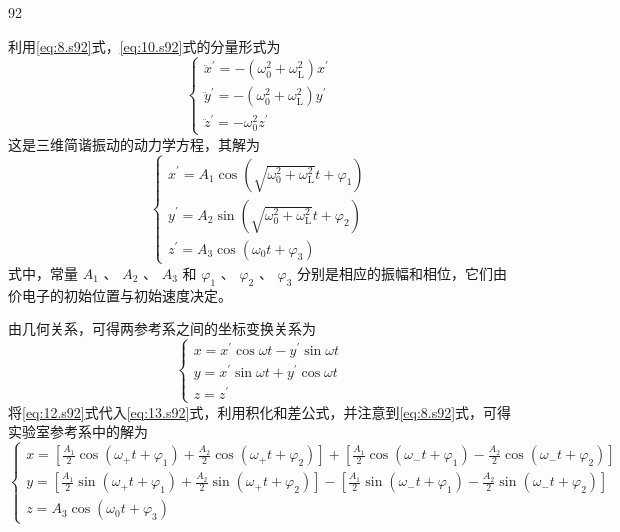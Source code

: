 \begin{solution}{92}
\begin{subsolution}
\begin{equation}
\label{eq:10.s92}
\end{equation}
利用\eqref{eq:8.s92}式，\eqref{eq:10.s92}式的分量形式为
\begin{equation}
\left\{ \begin{array}{l} \ddot {x} ^ {\prime} = - \left(\omega_ {0} ^ {2} + \omega_ {\mathrm{L}} ^ {2}\right) x ^ {\prime} \\ \ddot {y} ^ {\prime} = - \left(\omega_ {0} ^ {2} + \omega_ {\mathrm{L}} ^ {2}\right) y ^ {\prime} \\ \ddot {z} ^ {\prime} = - \omega_ {0} ^ {2} z ^ {\prime} \end{array} \right.
\label{eq:11.s92}
\end{equation}
这是三维简谐振动的动力学方程，其解为
\begin{equation}
\left\{ \begin{array}{l} x ^ {\prime} = A _ {1} \cos \left(\sqrt {\omega_ {0} ^ {2} + \omega_ {\mathrm{L}} ^ {2}} t + \varphi_ {1}\right) \\ y ^ {\prime} = A _ {2} \sin \left(\sqrt {\omega_ {0} ^ {2} + \omega_ {\mathrm{L}} ^ {2}} t + \varphi_ {2}\right) \\ z ^ {\prime} = A _ {3} \cos \left(\omega_ {0} t + \varphi_ {3}\right) \end{array} \right.
\label{eq:12.s92}
\end{equation}
式中，常量 $A_{1}$ 、 $A_{2}$ 、 $A_{3}$ 和 $\varphi_{1}$ 、 $\varphi_{2}$ 、 $\varphi_{3}$ 分别是相应的振幅和相位，它们由价电子的初始位置与初始速度决定。
\end{subsolution}
\begin{subsolution}
由几何关系，可得两参考系之间的坐标变换关系为
\begin{equation}
\left\{ \begin{array}{l} x = x ^ {\prime} \cos \omega t - y ^ {\prime} \sin \omega t \\ y = x ^ {\prime} \sin \omega t + y ^ {\prime} \cos \omega t \\ z = z ^ {\prime} \end{array} \right.
\label{eq:13.s92}
\end{equation}
将\eqref{eq:12.s92}式代入\eqref{eq:13.s92}式，利用积化和差公式，并注意到\eqref{eq:8.s92}式，可得实验室参考系中的解为
\begin{equation}
\left\{ \begin{array}{l} x = \left[ \frac {A _ {1}}{2} \cos (\omega_ {+} t + \varphi_ {1}) + \frac {A _ {2}}{2} \cos (\omega_ {+} t + \varphi_ {2}) \right] + \left[ \frac {A _ {1}}{2} \cos (\omega_ {-} t + \varphi_ {1}) - \frac {A _ {2}}{2} \cos (\omega_ {-} t + \varphi_ {2}) \right] \\ y = \left[ \frac {A _ {1}}{2} \sin (\omega_ {+} t + \varphi_ {1}) + \frac {A _ {2}}{2} \sin (\omega_ {+} t + \varphi_ {2}) \right] - \left[ \frac {A _ {1}}{2} \sin (\omega_ {-} t + \varphi_ {1}) - \frac {A _ {2}}{2} \sin (\omega_ {-} t + \varphi_ {2}) \right] \\ z = A _ {3} \cos (\omega_ {0} t + \varphi_ {3}) \end{array} \right.

\end{equation}
\end{subsolution}
\end{solution}
